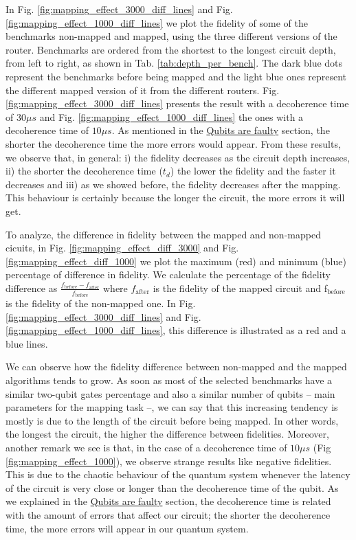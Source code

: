 In Fig. \ref{fig:mapping_effect_3000_diff_lines} and Fig. \ref{fig:mapping_effect_1000_diff_lines} we plot the fidelity of some of the benchmarks non-mapped and mapped, using the three different versions of the router. Benchmarks are ordered from the shortest to the longest circuit depth, from left to right, as shown in Tab. \ref{tab:depth_per_bench}.
The dark blue dots represent the benchmarks before being mapped and the light blue ones represent the different mapped version of it from the different routers.
Fig. \ref{fig:mapping_effect_3000_diff_lines} presents the result with a decoherence time of \(30 \mu s\) and Fig. \ref{fig:mapping_effect_1000_diff_lines} the ones with a decoherence time of \(10 \mu s\).
As mentioned in the \href{quantum_computing.org}{Qubits are faulty} section, the shorter the decoherence time the more errors would appear.
From these results, we observe that, in general: i)  the fidelity decreases as the circuit depth increases, ii) the shorter the decoherence time ($t_d$) the lower the fidelity and the faster it decreases and iii) as we showed before, the fidelity decreases after the mapping.
This behaviour is certainly because the longer the circuit, the more errors it will get.

To analyze, the difference in fidelity between the mapped and non-mapped cicuits, in Fig. \ref{fig:mapping_effect_diff_3000} and Fig. \ref{fig:mapping_effect_diff_1000} we plot the maximum (red) and minimum (blue) percentage of difference in fidelity.
We calculate the percentage of the fidelity difference as \(\frac{f_{\text{before}} - f_{\text{after}}}{f_{\text{before}}}\) where \(f_{\text{after}}\) is the fidelity of the mapped circuit and f\(_{\text{before}}\) is the fidelity of the non-mapped one.
In Fig. \ref{fig:mapping_effect_3000_diff_lines} and Fig. \ref{fig:mapping_effect_1000_diff_lines}, this difference is illustrated as a red and a blue lines.

We can observe how the fidelity difference between non-mapped and the mapped algorithms tends to grow.
As soon as most of the selected benchmarks have a similar two-qubit gates percentage and also a similar number of qubits -- main parameters for the mapping task --, we can say that this increasing tendency is mostly is due to the length of the circuit before being mapped.
In other words, the longest the circuit, the higher the difference between fidelities.
Moreover, another remark we see is that, in the case of a decoherence time of \(10 \mu s\) (Fig \ref{fig:mapping_effect_1000}), we observe strange results like negative fidelities. 
This is due to the chaotic behaviour of the quantum system whenever the latency of the circuit is very close or longer than the decoherence time of the qubit.
As we explained in the \href{quantum_computing.org}{Qubits are faulty} section, the decoherence time is related with the amount of errors that affect our circuit; the shorter the decoherence time, the more errors will appear in our quantum system.




